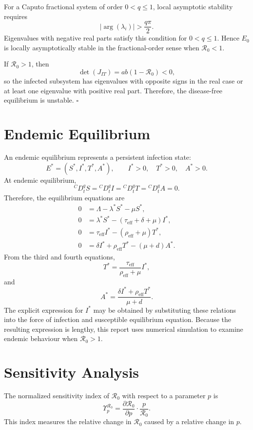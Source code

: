 \documentclass[12pt,a4paper,oneside]{report}
\newcommand{\Rzero}{\mathcal{R}_0}
\newcommand{\CaputoD}[2]{{}^{C}D_{#1}^{#2}}
\newcommand{\taueff}{\tau_{\mathrm{eff}}}
\newcommand{\rhoeff}{\rho_{\mathrm{eff}}}
\begin{document}
For a Caputo fractional system of order $0<q\leq1$, local asymptotic stability requires
\[
|\arg(\lambda_i)|>\frac{q\pi}{2}.
\]
Eigenvalues with negative real parts satisfy this condition for $0<q\leq1$. Hence $E_0$ is locally asymptotically stable in the fractional-order sense when $\Rzero<1$.

If $\Rzero>1$, then
\[
\det(J_{IT})=ab(1-\Rzero)<0,
\]
so the infected subsystem has eigenvalues with opposite signs in the real case or at least one eigenvalue with positive real part. Therefore, the disease-free equilibrium is unstable. \hfill$\square$

\section{Endemic Equilibrium}

An endemic equilibrium represents a persistent infection state:
\[
E^*=(S^*,I^*,T^*,A^*),
\qquad
I^*>0,\quad T^*>0,\quad A^*>0.
\]
At endemic equilibrium,
\[
\CaputoD{t}{q}S=
\CaputoD{t}{q}I=
\CaputoD{t}{q}T=
\CaputoD{t}{q}A=0.
\]
Therefore, the equilibrium equations are
\begin{align}
0&=\Lambda-\lambda^*S^*-\mu S^*,\\
0&=\lambda^*S^*-(\taueff+\delta+\mu)I^*,\\
0&=\taueff I^*-(\rhoeff+\mu)T^*,\\
0&=\delta I^*+\rhoeff T^*-(\mu+d)A^*.
\end{align}
From the third and fourth equations,
\[
T^*=\frac{\taueff}{\rhoeff+\mu}I^*,
\]
and
\[
A^*=
\frac{\delta I^*+\rhoeff T^*}{\mu+d}.
\]
The explicit expression for $I^*$ may be obtained by substituting these relations into the force of infection and susceptible equilibrium equation. Because the resulting expression is lengthy, this report uses numerical simulation to examine endemic behaviour when $\Rzero>1$.

\section{Sensitivity Analysis}

The normalized sensitivity index of $\Rzero$ with respect to a parameter $p$ is
\begin{equation}
\Upsilon_p^{\Rzero}
=
\frac{\partial \Rzero}{\partial p}\cdot\frac{p}{\Rzero}.
\label{eq:sensitivity_index}
\end{equation}
This index measures the relative change in $\Rzero$ caused by a relative change in $p$.
\end{document}
